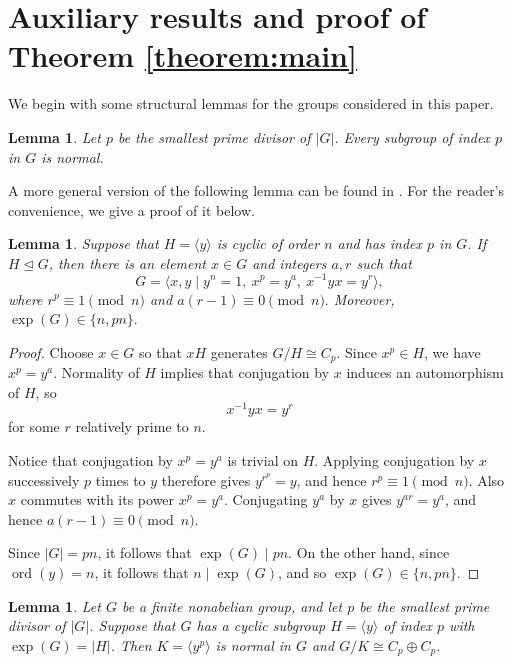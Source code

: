 \documentclass[a4paper, 12pt]{article}
\newtheorem{lemma}[theorem]{Lemma}
\theoremstyle{definition}
\DeclareMathOperator{\ord}{ord}
\begin{document}
\section{Auxiliary results and proof of Theorem \ref{theorem:main}}

We begin with some structural lemmas for the groups considered in this paper.

\begin{lemma}\label{lemma:normality}\cite[Corollary 4.10]{Hungerford}
Let $p$ be the smallest prime divisor of $|G|$.  Every subgroup of
index $p$ in $G$ is normal.
\end{lemma}

A more general version of the following lemma can be found in \cite[pp. 129--130, Theorem 21]{Zassenhaus}. For the reader's convenience, we give a proof of it below.

\begin{lemma}\label{lemma:grouppresentation}
Suppose that $H=\langle y\rangle$ is cyclic of order $n$ and has index
$p$ in $G$.  If $H\trianglelefteq G$, then there is an element
$x\in G$ and integers $a,r$ such that
$$G=\langle x,y\mid y^n=1,\ x^p=y^a,\ x^{-1}yx=y^r\rangle,$$
where
$r^p\equiv1\pmod n$ and $a(r-1)\equiv0\pmod n.$
Moreover, $\exp(G)\in\{n,pn\}.$
\end{lemma}

\begin{proof}
Choose $x\in G$ so that $xH$ generates $G/H\cong C_p$.  Since
$x^p\in H$, we have $x^p=y^a$.  Normality of $H$ implies that
conjugation by $x$ induces an automorphism of $H$, so
$$x^{-1}yx=y^r$$ for some $r$ relatively prime to $n$.

Notice that conjugation by $x^p=y^a$ is trivial on $H$.  Applying conjugation by
$x$ successively $p$ times to $y$ therefore gives
$y^{r^p}=y$, and hence $r^p\equiv1\pmod n$.  Also $x$ commutes with
its power $x^p=y^a$.  Conjugating $y^a$ by $x$ gives
$y^{ar}=y^a$, and hence $a(r-1)\equiv0\pmod n$.

Since $|G|=pn$, it follows that $\exp(G)\mid pn$. On the other hand, since $\ord(y)=n$, it follows that $n\mid \exp(G)$, and so $\exp(G)\in \{n,pn\}$.
\end{proof}

\begin{lemma}\label{lemma:ranktwoquotient}
Let $G$ be a finite nonabelian group, and let $p$ be the smallest prime
divisor of $|G|$. Suppose that $G$ has a cyclic subgroup
$H=\langle y\rangle$
of index $p$ with $\exp(G)=|H|$.
Then $K=\langle y^p\rangle$
is normal in $G$ and $G/K\cong C_p\oplus C_p.$
\end{lemma}
\end{document}
